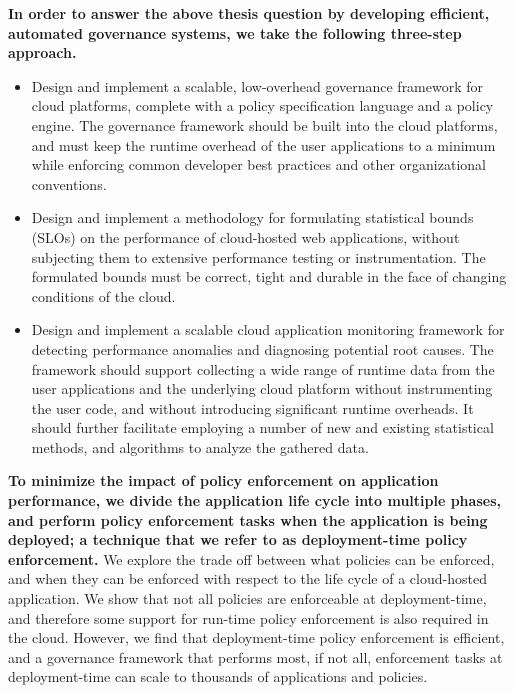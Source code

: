 \textbf{In order to answer the above thesis question by developing efficient, automated governance systems,
we take the following three-step approach.}
\begin{itemize}
\item Design and implement a scalable, low-overhead governance framework for cloud platforms,
complete with a policy specification language and a policy engine. The governance framework should be
built into the cloud platforms, and must
keep the runtime overhead of the user applications to a minimum while enforcing
common developer best practices and other organizational conventions.
\item Design and implement a methodology for formulating statistical bounds (SLOs) on the
performance of cloud-hosted web applications, without
 subjecting them to extensive performance testing or instrumentation. The formulated
bounds must be correct, tight and durable in the face of changing
 conditions of the cloud.
 \item Design and implement a scalable cloud application monitoring framework for detecting
performance anomalies and diagnosing potential root causes. 
The framework should support collecting
 a wide range of runtime data from the user applications and the underlying cloud platform
 without instrumenting the user code, and without introducing significant runtime overheads.
 It should further facilitate employing a number of new and existing statistical methods,
 and algorithms to analyze the gathered data.
\end{itemize}

\textbf{To minimize the impact of policy enforcement on application performance,
we divide the application life cycle into multiple phases, and perform policy
enforcement tasks when the application is being deployed; a technique that we
refer to as deployment-time policy enforcement.} 
We explore the
trade off between what policies can be enforced, and when they can be enforced with respect
to the life cycle of a cloud-hosted application. 
We show that not all policies
are enforceable at deployment-time, and therefore some support for run-time policy enforcement
is also required in the cloud. However, we find that
deployment-time policy enforcement is efficient, and a governance framework that
performs most, if not all, enforcement tasks at deployment-time can scale
to thousands of applications and policies.

